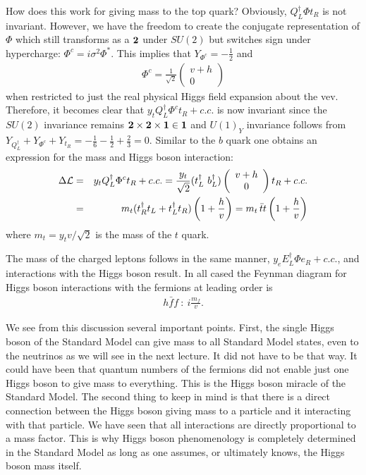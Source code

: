 \documentclass[12pt]{article}
\def\beq{\begin{eqnarray}}
\def\eeq{\end{eqnarray}}
\def\bea{\begin{eqnarray}}
\def\eea{\end{eqnarray}}
\begin{document}
How does this work for giving mass to the top quark?
Obviously, $Q^\dagger_L \Phi t_R$ is not invariant. However, we have the freedom to create the conjugate representation of $\Phi$ which still transforms as a ${\bf 2}$ under $SU(2)$ but switches sign under hypercharge: $\Phi^c=i\sigma^2 \Phi^*$. This implies that $Y_{\Phi^c}=-\frac{1}{2}$ and
\beq
\Phi^c=\frac{1}{\sqrt{2}}\left( \begin{array}{c} v+h\\ 0 \end{array}\right)
\eeq
when restricted to just the real physical Higgs field expansion about the vev.  Therefore, it becomes clear that $y_t Q_L^\dagger \Phi^c t_R+c.c.$ is now invariant since the $SU(2)$ invariance remains ${\bf 2}\times {\bf 2}\times {\bf 1}\in {\bf 1}$ and $U(1)_Y$ invariance follows from $Y_{Q^\dagger_L}+Y_{\Phi^c}+Y_{t_R}=-\frac{1}{6}-\frac{1}{2}+\frac{2}{3}=0$. Similar to the $b$ quark one obtains an expression for the mass and Higgs boson interaction:
\bea
\Delta{\cal L} &=&y_tQ^\dagger_L \Phi^c t_R+c.c.=\frac{y_t}{\sqrt{2}}(t^\dagger_L~b^\dagger_L)
\left( \begin{array}{c} v+h \\ 0 \end{array}\right)t_R+c.c. \\
& = & m_t(t^\dagger_R t_L+t^\dagger_L t_R)\left( 1+\frac{h}{v}\right)=
m_t\, \bar t t\left( 1+\frac{h}{v}\right)
\eea
where $m_t=y_tv/\sqrt{2}$ is the  mass of the $t$ quark.  

The mass of the charged leptons follows in the same manner, $y_eE^\dagger_L \Phi e_R+c.c.$, and interactions with the Higgs boson result. In all cased the Feynman diagram for Higgs boson interactions with the fermions at leading order is
\beq
h\bar f f ~ : ~ i\frac{m_f}{v}.
\eeq

We see from this discussion several important points. First, the single Higgs boson of the Standard Model can give mass to all Standard Model states, even to the neutrinos as we will see in the next lecture. It did not have to be that way. It could have been that quantum numbers of the fermions did not enable just one Higgs boson to give mass to everything. This is the Higgs boson miracle of the Standard Model.  The second thing to keep in mind is that there is a direct connection between the Higgs boson giving mass to a particle and it interacting with that particle. We have seen that all interactions are directly proportional to a mass factor. This is why Higgs boson phenomenology is completely determined in the Standard Model as long as one assumes, or ultimately knows, the Higgs boson mass itself.
\end{document}
